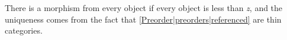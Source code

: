 There is a morphism from every object if every object is less than \emph{z}, and the uniqueness comes from the fact that \ref{Preorder|preorders|referenced} are thin categories.

